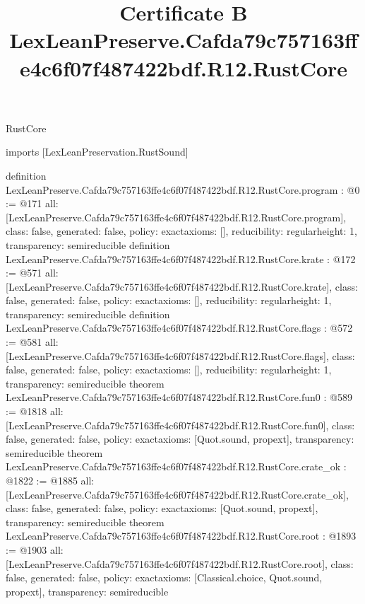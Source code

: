 \begin{lexlean}{RustCore}
\title{Certificate B LexLeanPreserve.Cafda79c757163ffe4c6f07f487422bdf.R12.RustCore}
\begin{coremodule}
imports [LexLeanPreservation.RustSound]

definition LexLeanPreserve.Cafda79c757163ffe4c6f07f487422bdf.R12.RustCore.program : @0 := @171 {
  all: [LexLeanPreserve.Cafda79c757163ffe4c6f07f487422bdf.R12.RustCore.program],
  class: false,
  generated: false,
  policy: exact{axioms: []},
  reducibility: regular{height: 1},
  transparency: semireducible
}
definition LexLeanPreserve.Cafda79c757163ffe4c6f07f487422bdf.R12.RustCore.krate : @172 := @571 {
  all: [LexLeanPreserve.Cafda79c757163ffe4c6f07f487422bdf.R12.RustCore.krate],
  class: false,
  generated: false,
  policy: exact{axioms: []},
  reducibility: regular{height: 1},
  transparency: semireducible
}
definition LexLeanPreserve.Cafda79c757163ffe4c6f07f487422bdf.R12.RustCore.flags : @572 := @581 {
  all: [LexLeanPreserve.Cafda79c757163ffe4c6f07f487422bdf.R12.RustCore.flags],
  class: false,
  generated: false,
  policy: exact{axioms: []},
  reducibility: regular{height: 1},
  transparency: semireducible
}
theorem LexLeanPreserve.Cafda79c757163ffe4c6f07f487422bdf.R12.RustCore.fun0 : @589 := @1818 {
  all: [LexLeanPreserve.Cafda79c757163ffe4c6f07f487422bdf.R12.RustCore.fun0],
  class: false,
  generated: false,
  policy: exact{axioms: [Quot.sound, propext]},
  transparency: semireducible
}
theorem LexLeanPreserve.Cafda79c757163ffe4c6f07f487422bdf.R12.RustCore.crate_ok : @1822 := @1885 {
  all: [LexLeanPreserve.Cafda79c757163ffe4c6f07f487422bdf.R12.RustCore.crate_ok],
  class: false,
  generated: false,
  policy: exact{axioms: [Quot.sound, propext]},
  transparency: semireducible
}
theorem LexLeanPreserve.Cafda79c757163ffe4c6f07f487422bdf.R12.RustCore.root : @1893 := @1903 {
  all: [LexLeanPreserve.Cafda79c757163ffe4c6f07f487422bdf.R12.RustCore.root],
  class: false,
  generated: false,
  policy: exact{axioms: [Classical.choice, Quot.sound, propext]},
  transparency: semireducible
}


\end{coremodule}
\end{lexlean}
